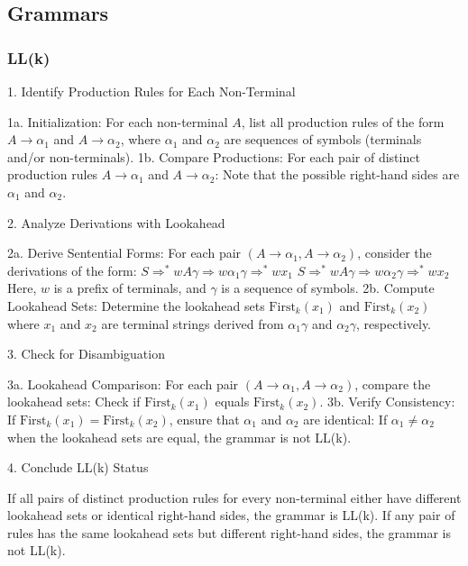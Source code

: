 \subsection{Grammars}

\subsubsection{LL(k)}
1. Identify Production Rules for Each Non-Terminal

    1a. Initialization:
    For each non-terminal \( A \), list all production rules of the form \( A \rightarrow \alpha_1 \) and \( A \rightarrow \alpha_2 \), where \( \alpha_1 \) and \( \alpha_2 \) are sequences of symbols (terminals and/or non-terminals).
    1b. Compare Productions:
    For each pair of distinct production rules \( A \rightarrow \alpha_1 \) and \( A \rightarrow \alpha_2 \):
        Note that the possible right-hand sides are \( \alpha_1 \) and \( \alpha_2 \).

2. Analyze Derivations with Lookahead

    2a. Derive Sentential Forms:
    For each pair \( (A \rightarrow \alpha_1, A \rightarrow \alpha_2) \), consider the derivations of the form:
        \( S \Rightarrow^* w A \gamma \Rightarrow w \alpha_1 \gamma \Rightarrow^* w x_1 \)
        \( S \Rightarrow^* w A \gamma \Rightarrow w \alpha_2 \gamma \Rightarrow^* w x_2 \)
    Here, \( w \) is a prefix of terminals, and \( \gamma \) is a sequence of symbols.
    2b. Compute Lookahead Sets:
    Determine the lookahead sets \( \text{First}_k(x_1) \) and \( \text{First}_k(x_2) \) where \( x_1 \) and \( x_2 \) are terminal strings derived from \( \alpha_1 \gamma \) and \( \alpha_2 \gamma \), respectively.

3. Check for Disambiguation

    3a. Lookahead Comparison:
    For each pair \( (A \rightarrow \alpha_1, A \rightarrow \alpha_2) \), compare the lookahead sets:
        Check if \( \text{First}_k(x_1) \) equals \( \text{First}_k(x_2) \).
    3b. Verify Consistency:
    If \( \text{First}_k(x_1) = \text{First}_k(x_2) \), ensure that \( \alpha_1 \) and \( \alpha_2 \) are identical:
        If \( \alpha_1 \neq \alpha_2 \) when the lookahead sets are equal, the grammar is not LL(k).

4. Conclude LL(k) Status

    If all pairs of distinct production rules for every non-terminal either have different lookahead sets or identical right-hand sides, the grammar is LL(k).
    If any pair of rules has the same lookahead sets but different right-hand sides, the grammar is not LL(k).


